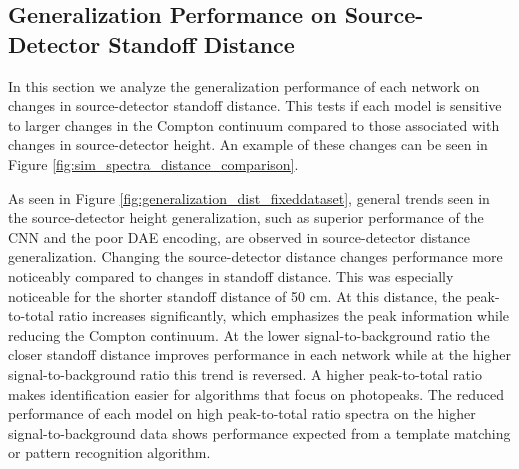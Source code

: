 \subsection{Generalization Performance on Source-Detector Standoff Distance}

In this section we analyze the generalization performance of each network on changes in source-detector standoff distance. This tests if each model is sensitive to larger changes in the Compton continuum compared to those associated with changes in source-detector height. An example of these changes can be seen in Figure \ref{fig:sim_spectra_distance_comparison}.

As seen in Figure \ref{fig:generalization_dist_fixeddataset}, general trends seen in the source-detector height generalization, such as superior performance of the CNN and the poor DAE encoding, are observed in source-detector distance generalization. Changing the source-detector distance changes performance more noticeably compared to changes in standoff distance. This was especially noticeable for the shorter standoff distance of 50 cm. At this distance, the peak-to-total ratio increases significantly, which emphasizes the peak information while reducing the Compton continuum. At the lower signal-to-background ratio the closer standoff distance improves performance in each network while at the higher signal-to-background ratio this trend is reversed. A higher peak-to-total ratio makes identification easier for algorithms that focus on photopeaks. The reduced performance of each model on high peak-to-total ratio spectra on the higher signal-to-background data shows performance expected from a template matching or pattern recognition algorithm.


